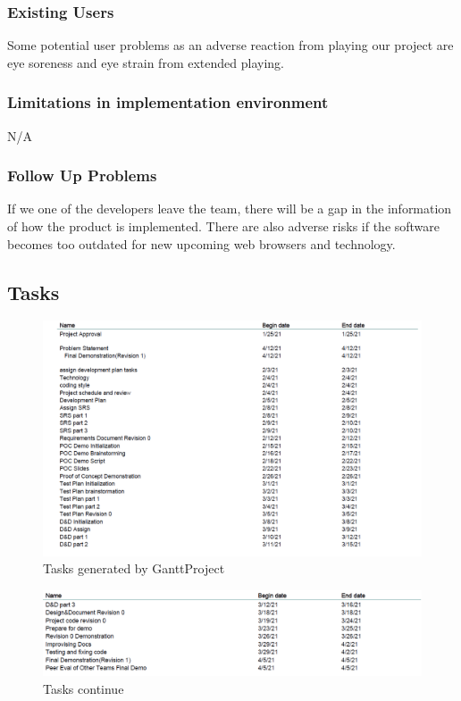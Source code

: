 \documentclass[12pt, titlepage]{article}
\begin{document}
\subsubsection{Existing Users}
Some potential user problems as an adverse reaction from playing our project are eye soreness and eye strain from extended playing.
\subsubsection{Limitations in implementation environment}
N/A
\subsubsection{Follow Up Problems}
If we one of the developers leave the team, there will be a gap in the information of how the product is implemented. There are also adverse risks if the software becomes too outdated for new upcoming web browsers and technology.

\subsection{Tasks}
\begin{figure}[h]
\includegraphics[width=12cm]{task1.png}
\caption{Tasks generated by GanttProject}
\end{figure}
\begin{figure}[h]
\includegraphics[width=13cm]{task2.png}
\caption{Tasks continue}
\end{figure}
\end{document}
